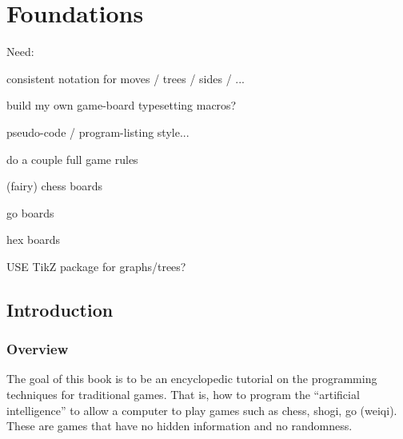 \documentclass[10pt,dvipdfmx]{report}
\begin{document}

\tableofcontents

\part{Foundations}





Need:

consistent notation for moves / trees / sides / ...

build my own game-board typesetting macros?

pseudo-code / program-listing style...

do a couple full game rules

(fairy) chess boards

go boards

hex boards

USE TikZ package for graphs/trees?

\chapter{Introduction}
\label{chap-introduction}

\section{Overview}

The goal of this book is to be an encyclopedic tutorial on the programming techniques for
traditional games.  That is, how to program the ``artificial intelligence'' to allow
a computer to play games such as chess, shogi, go (weiqi).  These are games that have no hidden
information and no randomness.
\end{document}
